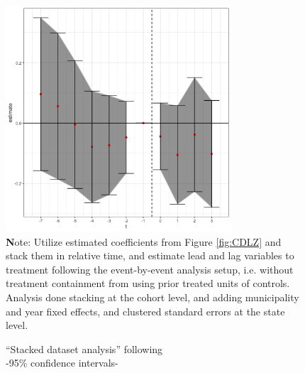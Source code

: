 \documentclass[12pt]{amsart}
\numberwithin{equation}{section}
\theoremstyle{definition}
\theoremstyle{definition}
\theoremstyle{definition}
\begin{document}
   
\begin{figure}[H]
\centering
\caption{``Stacked dataset analysis'' following \citet{cengiz_etal_2019}\\ -95\% confidence intervals-} 
\label{fig:stacked_wcontrols_agreements}

\includegraphics[width=0.75\textwidth]{../Figures/stacked_dataset_wcontrols_acuerdo.png}
       \captionsetup{justification=centering}
       \\
 {\textbf Note: Utilize estimated coefficients from Figure \ref{fig:CDLZ} and stack them in relative time, and estimate lead and lag variables to treatment following the event-by-event analysis setup, i.e. without treatment containment from using prior treated units of controls. Analysis done stacking at the cohort level, and adding municipality and year fixed effects, and clustered standard errors at the state level.}   
\end{figure}   
\end{document}
